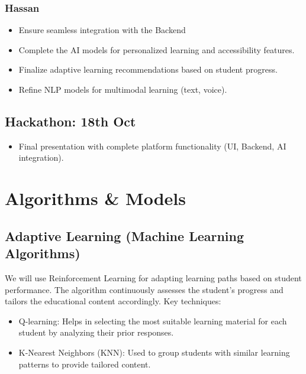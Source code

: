 \documentclass{article}
\begin{document}
\subsubsection{Hassan}
\begin{itemize}
    \item Ensure seamless integration with the Backend
    \item Complete the AI models for personalized learning and accessibility features.
    \item Finalize adaptive learning recommendations based on student progress.
    \item Refine NLP models for multimodal learning (text, voice).
\end{itemize}

\subsection{Hackathon: 18th Oct}
\begin{itemize}
    \item Final presentation with complete platform functionality (UI, Backend, AI integration).
\end{itemize}

\section{Algorithms \& Models}

\subsection{Adaptive Learning (Machine Learning Algorithms)}
We will use Reinforcement Learning for adapting learning paths based on student performance. The algorithm continuously assesses the student's progress and tailors the educational content accordingly. Key techniques:
\begin{itemize}
    \item Q-learning: Helps in selecting the most suitable learning material for each student by analyzing their prior responses.
    \item K-Nearest Neighbors (KNN): Used to group students with similar learning patterns to provide tailored content.
\end{itemize}
\end{document}
